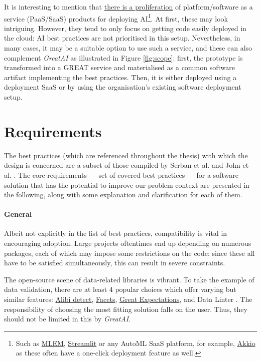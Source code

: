 It is interesting to mention that \href{https://xkcd.com/927/}{there is a proliferation} of platform/software as a service (PaaS/SaaS) products for deploying AI\footnote{Such as \href{https://mlem.ai/}{MLEM}, \href{https://streamlit.io/cloud}{Streamlit} or any AutoML SaaS platform, for example, \href{https://www.akkio.com/role/software-engineers}{Akkio} as these often have a one-click deployment feature as well.}. At first, these may look intriguing. However, they tend to only focus on getting code easily deployed in the cloud: AI best practices are not prioritised in this setup. Nevertheless, in many cases, it may be a suitable option to use such a service, and these can also complement \textit{GreatAI} as illustrated in Figure \ref{fig:scope}: first, the prototype is transformed into a GREAT service and materialised as a common software artifact implementing the best practices. Then, it is either deployed using a deployment SaaS or by using the organisation's existing software deployment setup.

\section{Requirements} \label{section:requirements}

The best practices (which are referenced throughout the thesis) with which the design is concerned are a subset of those compiled by Serban et al. \cite{serban2020adoption,serban2021practices} and John et al. \cite{john2020architecting}. The core requirements --- set of covered best practices --- for a software solution that has the potential to improve our problem context are presented in the following, along with some explanation and clarification for each of them.

\paragraph{General} Albeit not explicitly in the list of best practices, compatibility is vital in encouraging adoption. Large projects oftentimes end up depending on numerous packages, each of which may impose some restrictions on the code: since these all have to be satisfied simultaneously, this can result in severe constraints. 

The open-source scene of data-related libraries is vibrant. To take the example of data validation, there are at least 4 popular choices which offer varying but similar features: \href{https://github.com/SeldonIO/alibi-detect}{Alibi detect}, \href{https://github.com/PAIR-code/facets}{Facets}, \href{https://github.com/great-expectations/great_expectations}{Great Expectations}, and Data Linter \cite{hynes2017data}. The responsibility of choosing the most fitting solution falls on the user. Thus, they should not be limited in this by \textit{GreatAI}. 

